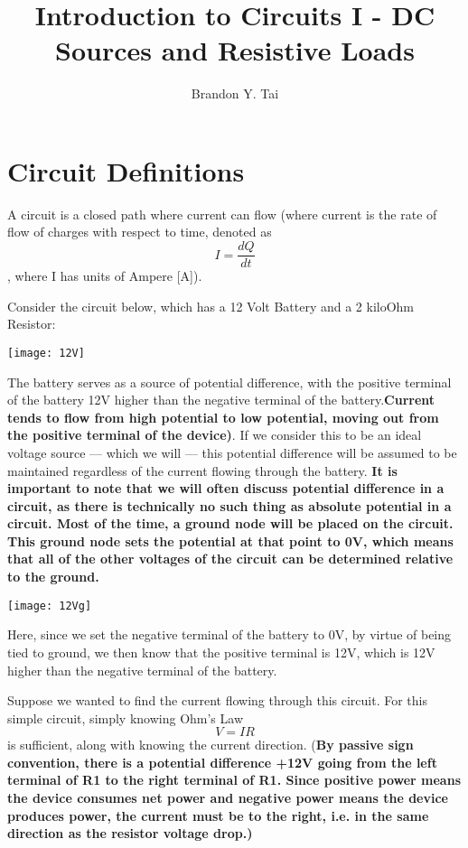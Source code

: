 \documentclass[12pt,letterpaper]{article}
\begin{document}
\title{Introduction to Circuits I - DC Sources and Resistive Loads}
\author{Brandon Y. Tai}
\maketitle

\setcounter{section}{0}
\section{Circuit Definitions}
A circuit is a closed path where current can flow (where current is the rate of flow of charges with respect to time, denoted as \begin{equation} I = \frac{dQ}{dt} \end{equation}, where I has units of Ampere [A]). \par

Consider the circuit below, which has a 12 Volt Battery and a 2 kiloOhm Resistor:
\begin{center}
\texttt{[image: 12V]} \label{Fig. 1}
\end{center}


The battery serves as a source of potential difference, with the positive terminal of the battery 12V higher than the negative terminal of the battery.\textbf{Current tends to flow from high potential to low potential, moving out from the positive terminal of the device)}. If we consider this to be an ideal voltage source --- which we will --- this potential difference will be assumed to be maintained regardless of the current flowing through the battery. \textbf{It is important to note that we will often discuss potential difference in a circuit, as there is technically no such thing as absolute potential in a circuit. Most of the time, a ground node will be placed on the circuit. This ground node sets the potential at that point to 0V, which means that all of the other voltages of the circuit can be determined relative to the ground. }\par

\begin{center}
\texttt{[image: 12Vg]} \label{Fig. 2}
\end{center}

Here, since we set the negative terminal of the battery to 0V, by virtue of being tied to ground, we then know that the positive terminal is 12V, which is 12V higher than the negative terminal of the battery.  \par

Suppose we wanted to find the current flowing through this circuit. For this simple circuit, simply knowing Ohm's Law \begin{equation} V = IR \end{equation} is sufficient, along with knowing the current direction. (\textbf{By passive sign convention, there is a potential difference +12V going from the left terminal of R1 to the right terminal of R1. Since positive power means the device consumes net power and negative power means the device produces power, the current must be to the right, i.e. in the same direction as the resistor voltage drop.)}
\end{document}
